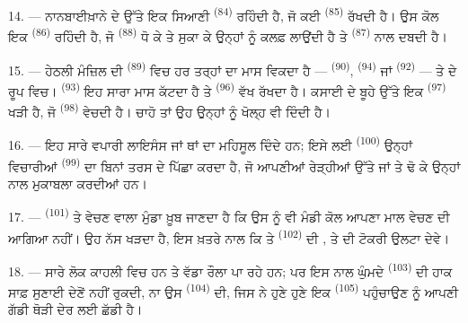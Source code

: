 14. --- ਨਾਨਬਾਈਖ਼ਾਨੇ ਦੇ ਉੱਤੇ ਇਕ ਸਿਆਣੀ  \textsuperscript{(84)}
ਰਹਿੰਦੀ ਹੈ, ਜੋ ਕਈ  \textsuperscript{(85)} ਰੱਖਦੀ ਹੈ। ਉਸ ਕੋਲ
ਇਕ  \textsuperscript{(86)} ਰਹਿੰਦੀ ਹੈ, ਜੋ
 \textsuperscript{(88)} ਧੋ ਕੇ ਤੇ ਸੁਕਾ ਕੇ ਉਨ੍ਹਾਂ ਨੂੰ ਕਲਫ਼ ਲਾਉਂਦੀ ਹੈ ਤੇ
 \textsuperscript{(87)} ਨਾਲ ਦਬਦੀ ਹੈ।

\VUsaut{4.0mm}
\VUsaut{3.0mm}

15. --- ਹੇਠਲੀ ਮੰਜ਼ਿਲ ਦੀ  \textsuperscript{(89)} ਵਿਚ ਹਰ ਤਰ੍ਹਾਂ
ਦਾ ਮਾਸ ਵਿਕਦਾ ਹੈ —  \textsuperscript{(90)}, 
\textsuperscript{(94)} ਜਾਂ  \textsuperscript{(92)} —  ਤੇ  ਦੇ ਰੂਪ ਵਿਚ। 
\textsuperscript{(93)} ਇਹ ਸਾਰਾ ਮਾਸ ਕੱਟਦਾ ਹੈ ਤੇ 
\textsuperscript{(96)} ਵੱਖ ਰੱਖਦਾ ਹੈ। ਕਸਾਈ ਦੇ ਬੂਹੇ ਉੱਤੇ ਇਕ
 \textsuperscript{(97)} ਖੜੀ ਹੈ, ਜੋ 
\textsuperscript{(98)} ਵੇਚਦੀ ਹੈ। ਚਾਹੋ ਤਾਂ ਉਹ ਉਨ੍ਹਾਂ ਨੂੰ ਖੋਲ੍ਹ ਵੀ ਦਿੰਦੀ ਹੈ।

16. --- ਇਹ ਸਾਰੇ ਵਪਾਰੀ ਲਾਇਸੰਸ ਜਾਂ ਥਾਂ ਦਾ ਮਹਿਸੂਲ ਦਿੰਦੇ ਹਨ; ਇਸੇ ਲਈ
 \textsuperscript{(100)} ਉਨ੍ਹਾਂ ਵਿਚਾਰੀਆਂ
 \textsuperscript{(99)} ਦਾ ਬਿਨਾਂ ਤਰਸ ਦੇ ਪਿੱਛਾ
ਕਰਦਾ ਹੈ, ਜੋ ਆਪਣੀਆਂ ਰੇੜ੍ਹੀਆਂ ਉੱਤੇ  ਜਾਂ
 ਤੇ
 ਢੋ ਕੇ ਉਨ੍ਹਾਂ ਨਾਲ ਮੁਕਾਬਲਾ ਕਰਦੀਆਂ ਹਨ।

\VUsaut{4.0mm}
\VUsaut{3.0mm}

17. ---  \textsuperscript{(101)} ਤੇ  ਵੇਚਣ ਵਾਲਾ ਮੁੰਡਾ ਖ਼ੂਬ
ਜਾਣਦਾ ਹੈ ਕਿ ਉਸ ਨੂੰ ਵੀ ਮੰਡੀ ਕੋਲ ਆਪਣਾ ਮਾਲ ਵੇਚਣ ਦੀ ਆਗਿਆ ਨਹੀਂ। ਉਹ ਨੱਸ ਖੜਦਾ ਹੈ, ਇਸ
ਖ਼ਤਰੇ ਨਾਲ ਕਿ  ਤੇ  
\textsuperscript{(102)} ਦੀ ,  ਤੇ
 ਦੀ ਟੋਕਰੀ ਉਲਟਾ ਦੇਵੇ।

18. --- ਸਾਰੇ ਲੋਕ ਕਾਹਲੀ ਵਿਚ ਹਨ ਤੇ ਵੱਡਾ ਰੌਲਾ ਪਾ ਰਹੇ ਹਨ; ਪਰ ਇਸ ਨਾਲ ਘੁੰਮਦੇ
 \textsuperscript{(103)} ਦੀ ਹਾਕ ਸਾਫ਼ ਸੁਣਾਈ ਦੇਣੋਂ ਨਹੀਂ ਰੁਕਦੀ, ਨਾ
ਉਸ  \textsuperscript{(104)} ਦੀ, ਜਿਸ ਨੇ ਹੁਣੇ ਹੁਣੇ ਇਕ
 \textsuperscript{(105)} ਪਹੁੰਚਾਉਣ ਨੂੰ ਆਪਣੀ ਗੱਡੀ ਥੋੜੀ ਦੇਰ ਲਈ
ਛੱਡੀ ਹੈ।
\VUsaut{6.0mm}
\VUfilet{22mm}
